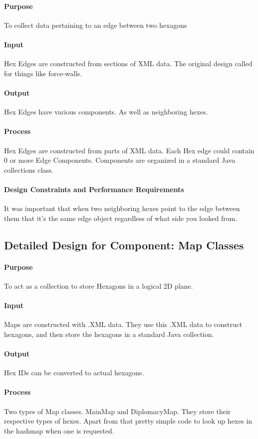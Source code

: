 \documentclass[12pt,a4paper,titlepage]{article}
\begin{document}
\paragraph{Purpose} To collect data pertaining to an edge between two hexagons
\paragraph{Input}
Hex Edges are constructed from sections of XML data.
The original design called for things like force-walls.
\paragraph{Output}
Hex Edges have various components. As well as neighboring hexes.
\paragraph{Process}
Hex Edges are constructed from parts of XML data.
Each Hex edge could contain 0 or more Edge Components.
Components are organized in a standard Java collections class.
\paragraph{Design Constraints and Performance Requirements}
It was important that when two neighboring hexes point to the edge between them
that it's the same edge object regardless of what side you looked from.

\subsection{Detailed Design for Component: Map Classes}
\paragraph{Purpose} To act as a collection to store Hexagons in a logical 2D plane.
\paragraph{Input}
Maps are constructed with .XML data. They use this .XML data to construct
hexagons, and then store the hexagons in a standard Java collection.
\paragraph{Output}
Hex IDs can be converted to actual hexagons.
\paragraph{Process}
Two types of Map classes. MainMap and DiplomacyMap. They store their respective
types of hexes. Apart from that pretty simple code to look up hexes in the hashmap
when one is requested.
\end{document}
